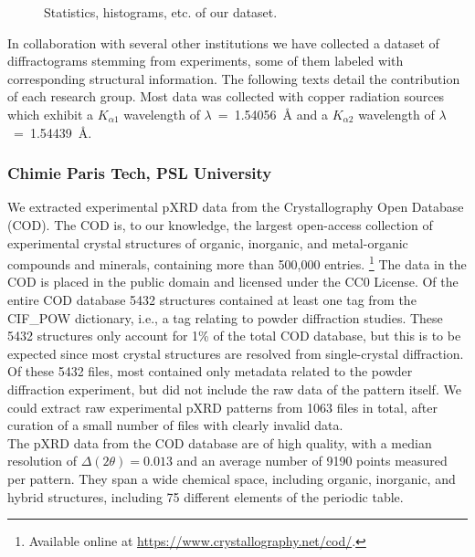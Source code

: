 \begin{figure*}[!ht]
    \centering
    \missingfigure{} 
    \caption{Statistics, histograms, etc. of our dataset.}
    \label{fig:statistics}
\end{figure*}

In collaboration with several other institutions we have collected a dataset of diffractograms stemming from experiments, some of them labeled with corresponding structural information. The following texts detail the contribution of each research group. Most data was collected with copper radiation sources which exhibit a $K_{\alpha1}$ wavelength of $\lambda$~=~1.54056~{\AA} and a $K_{\alpha2}$ wavelength of $\lambda$~=~1.54439~{\AA}.

\subsubsection*{Chimie Paris Tech, PSL University}

We extracted experimental pXRD data from the Crystallography Open Database (COD).\cite{Grazulis2009, Vaitkus2023} The COD is, to our knowledge, the largest open-access collection of experimental crystal structures of organic, inorganic, and metal-organic compounds and minerals, containing more than 500,000 entries. \footnote{Available online at \url{https://www.crystallography.net/cod/}.} The data in the COD is placed in the public domain and licensed under the CC0 License. Of the entire COD database 5432 structures contained at least one tag from the {CIF\_POW} dictionary, i.e., a tag relating to powder diffraction studies. These 5432 structures only account for 1\% of the total COD database, but this is to be expected since most crystal structures are resolved from single-crystal diffraction. Of these 5432 files, most contained only metadata related to the powder diffraction experiment, but did not include the raw data of the pattern itself. We could extract raw experimental pXRD patterns from 1063 files in total, after curation of a small number of files with clearly invalid data. \\

The pXRD data from the COD database are of high quality, with a median resolution of $\Delta(2\theta) = 0.013${\textdegree} and an average number of 9190 points measured per pattern. They span a wide chemical space, including organic, inorganic, and hybrid structures, including 75 different elements of the periodic table.

